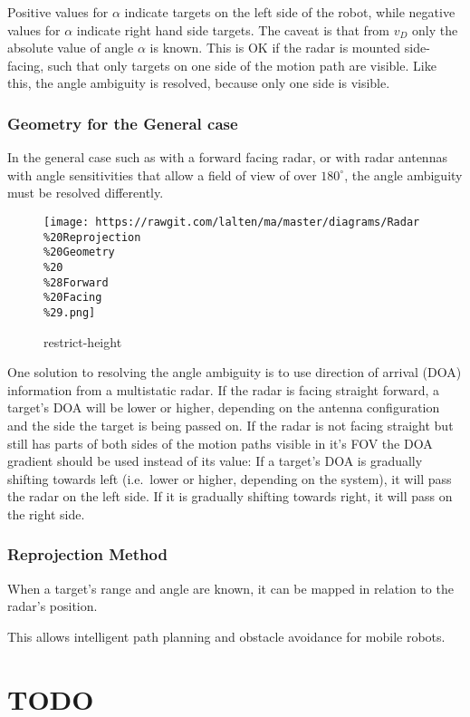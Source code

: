 Positive values for \(\alpha\) indicate targets on the left side of the
robot, while negative values for \(\alpha\) indicate right hand side
targets. The caveat is that from \(v_D\) only the absolute value of
angle \(\alpha\) is known. This is OK if the radar is mounted
side-facing, such that only targets on one side of the motion path are
visible. Like this, the angle ambiguity is resolved, because only one
side is visible.

\subsubsection{Geometry for the General
case}\label{geometry-for-the-general-case}

In the general case such as with a forward facing radar, or with radar
antennas with angle sensitivities that allow a field of view of over
\(180^\circ\), the angle ambiguity must be resolved differently.

\begin{figure}
\centering
\texttt{[image: https://rawgit.com/lalten/ma/master/diagrams/Radar\\\%20Reprojection\\\%20Geometry\\\%20\\\%28Forward\\\%20Facing\\\%29.png]}
\caption{restrict-height}
\end{figure}

One solution to resolving the angle ambiguity is to use direction of
arrival (DOA) information from a multistatic radar. If the radar is
facing straight forward, a target's DOA will be lower or higher,
depending on the antenna configuration and the side the target is being
passed on. If the radar is not facing straight but still has parts of
both sides of the motion paths visible in it's FOV the DOA gradient
should be used instead of its value: If a target's DOA is gradually
shifting towards left (i.e.~lower or higher, depending on the system),
it will pass the radar on the left side. If it is gradually shifting
towards right, it will pass on the right side.

\subsubsection{Reprojection Method}\label{reprojection-method}

When a target's range and angle are known, it can be mapped in relation
to the radar's position.

This allows intelligent path planning and obstacle avoidance for mobile
robots.

\section{TODO}\label{todo-1}

